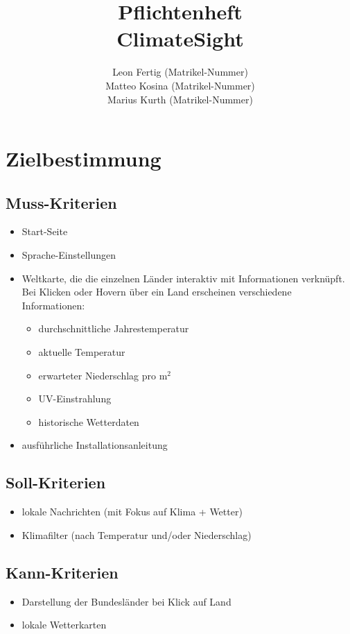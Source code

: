 \documentclass[a4paper]{scrreprt}
\begin{document}
 
\title{Pflichtenheft\\\glqq ClimateSight\grqq}
\author{Leon Fertig (Matrikel-Nummer)\\Matteo Kosina (Matrikel-Nummer) \\Marius Kurth (Matrikel-Nummer)}
\maketitle
 

\tableofcontents
 
\chapter{Zielbestimmung}
\section{Muss-Kriterien}
\begin{itemize}
    \item Start-Seite
    \item Sprache-Einstellungen
    \item Weltkarte, die die einzelnen Länder interaktiv mit Informationen verknüpft. Bei Klicken oder Hovern über ein Land erscheinen verschiedene Informationen:
    \begin{itemize}
        \item durchschnittliche Jahrestemperatur
        \item aktuelle Temperatur
        \item erwarteter Niederschlag pro m$^2$
        \item UV-Einstrahlung
        \item historische Wetterdaten
    \end{itemize}
    \item ausführliche Installationsanleitung
\end{itemize}

\section{Soll-Kriterien}
\begin{itemize}
    \item lokale Nachrichten (mit Fokus auf Klima + Wetter)
    \item Klimafilter (nach Temperatur und/oder Niederschlag)
\end{itemize}

\section{Kann-Kriterien}
\begin{itemize}
    \item Darstellung der Bundesländer bei Klick auf Land
    \item lokale Wetterkarten
\end{itemize}
\end{document}
